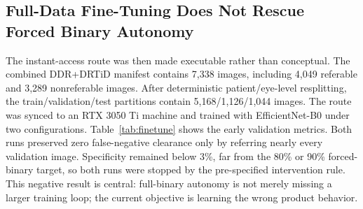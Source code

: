 \documentclass[journal]{IEEEtran}
\begin{document}
\subsection{Full-Data Fine-Tuning Does Not Rescue Forced Binary Autonomy}
The instant-access route was then made executable rather than conceptual. The combined DDR+DRTiD manifest contains 7,338 images, including 4,049 referable and 3,289 nonreferable images. After deterministic patient/eye-level resplitting, the train/validation/test partitions contain 5,168/1,126/1,044 images. The route was synced to an RTX 3050 Ti machine and trained with EfficientNet-B0 under two configurations. Table~\ref{tab:finetune} shows the early validation metrics. Both runs preserved zero false-negative clearance only by referring nearly every validation image. Specificity remained below 3\%, far from the 80\% or 90\% forced-binary target, so both runs were stopped by the pre-specified intervention rule. This negative result is central: full-binary autonomy is not merely missing a larger training loop; the current objective is learning the wrong product behavior.

\begin{table}[t]
\centering
\caption{Full-binary end-to-end fine-tuning attempts on the combined DDR+DRTiD route. Thresholds are selected for zero validation false-negative clearance. Runs were stopped when specificity remained far from target.}
\label{tab:finetune}
\end{table}
\end{document}

